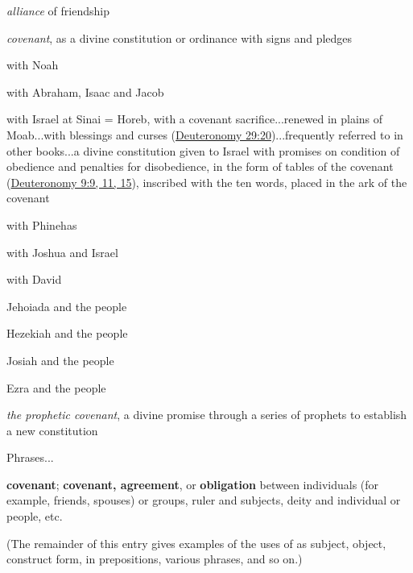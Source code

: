\begin{compactdesc}
\begin{compactitem}
							\item[II1] \textit{alliance} of friendship
							\item[II2] \textit{covenant}, as a divine constitution or ordinance with signs and pledges
							\item[II2a] with Noah
							\item[II2b] with Abraham, Isaac and Jacob
							\item[II2c] with Israel at Sinai = Horeb, with a covenant sacrifice...renewed in plains of Moab...with blessings and curses (\hyperref[DEUTERONOMY-29-20]{Deuteronomy 29:20})...frequently referred to in other books...a divine constitution given to Israel with promises on condition of obedience and penalties for disobedience, in the form of tables of the covenant (\hyperref[DEUTERONOMY-9-9]{Deuteronomy 9:9, 11, 15}), inscribed with the ten words, placed in the ark of the covenant
							\item[II2d] with Phinehas
							\item[II2e] with Joshua and Israel
							\item[II2f] with David
							\item[II2g] Jehoiada and the people
							\item[II2h] Hezekiah and the people
							\item[II2i] Josiah and the people
							\item[II2j] Ezra and the people
							\item[II2k] \textit{the prophetic covenant}, a divine promise through a series of prophets to establish a new constitution
							\item[III] Phrases...
						\end{compactitem}
					\item[DCH PDF 739] \textbf{covenant}; \textbf{covenant, agreement}, or \textbf{obligation} between individuals (for example, friends, spouses) or groups, ruler and subjects, deity and individual or people, etc.
						\begin{compactitem}
							\item (The remainder of this entry gives examples of the uses of  as subject, object, construct form, in prepositions, various phrases, and so on.)
						\end{compactitem}
				\end{compactdesc}
				
			
